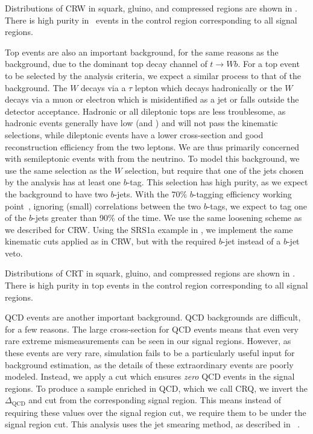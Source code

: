 Distributions of CRW in squark, gluino, and compressed regions are shown in .
There is high purity in \wjets~events in the control region corresponding to all signal regions.

Top events are also an important background, for the same reasons as the \wjets~ background, due to the dominant top decay channel of $t \rightarrow Wb$.
For a top event to be selected by the analysis criteria, we expect a similar process to that of the \wjets background.
The $W$ decays via a $\tau$ lepton which decays hadronically or the $W$ decays via a muon or electron which is misidentified as a jet or falls outside the detector acceptance.
Hadronic or all dileptonic tops are less troublesome, as hadronic \ttbar events generally have low \met (and ) and will not pass the kinematic selections, while dileptonic \ttbar events have a lower cross-section and good reconstruction efficiency from the two leptons.
We are thus primarily concerned with semileptonic \ttbar events with \met from the neutrino.
To model this background, we use the same selection as the $W$ selection, but require that one of the jets chosen by the analysis has at least one $b$-tag.
This selection has high purity, as we expect the \ttbar background to have two $b$-jets.
With the 70\% $b$-tagging efficiency working point~\cite{Aad:2015ydr,ATL-PHYS-PUB-2016-012}, ignoring (small) correlations between the two $b$-tags, we expect to tag one of the $b$-jets greater than 90\% of the time.
We use the same loosening scheme as we described for CRW.
Using the SRS1a example in , we implement the same kinematic cuts applied as in CRW, but with the required $b$-jet instead of a $b$-jet veto.

Distributions of CRT in squark, gluino, and compressed regions are shown in .
There is high purity in top events in the control region corresponding to all signal regions.

QCD events are another important background.
QCD backgrounds are difficult, for a few reasons.
The large cross-section for QCD events means that even very rare extreme mismeasurements can be seen in our signal regions.
However, as these events are very rare, simulation fails to be a particularly useful input for background estimation, as the details of these extraordinary events are poorly modeled.
Instead, we apply a cut which ensures \textit{zero} QCD events in the signal regions.
To produce a sample enriched in QCD, which we call CRQ, we invert the $\Delta_{\mathrm{QCD}}$ and  cut from the corresponding signal region.
This means instead of requiring these values over the signal region cut, we require them to be under the signal region cut.
This analysis uses the jet smearing method, as described in ~\cite{SUSY-2011-20}.

